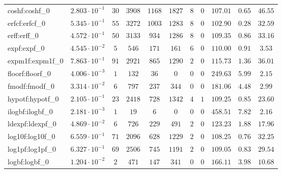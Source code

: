 \begin{tabular}{|l|c|c|c|c|c|c|c|c|c|c|}
coshf:coshf\_0               & $ 2.803 \cdot 10^{-1} $ & $ 30     $ & $ 3908  $ & $ 1168  $ & $ 1827  $ & $ 8   $ & $ 0 $ & $ 107.01      $ & $ 0.65    $ & $ 46.55   $ \\
erfcf:erfcf\_0               & $ 5.345 \cdot 10^{-1} $ & $ 55     $ & $ 3272  $ & $ 1003  $ & $ 1283  $ & $ 8   $ & $ 0 $ & $ 102.90      $ & $ 0.28    $ & $ 32.59   $ \\
erff:erff\_0                 & $ 4.572 \cdot 10^{-1} $ & $ 50     $ & $ 3133  $ & $ 934   $ & $ 1286  $ & $ 8   $ & $ 0 $ & $ 109.35      $ & $ 0.86    $ & $ 33.16   $ \\
expf:expf\_0                 & $ 4.545 \cdot 10^{-2} $ & $ 5      $ & $ 546   $ & $ 171   $ & $ 161   $ & $ 6   $ & $ 0 $ & $ 110.00      $ & $ 0.91    $ & $ 3.53    $ \\
expm1f:expm1f\_0             & $ 7.863 \cdot 10^{-1} $ & $ 91     $ & $ 2921  $ & $ 865   $ & $ 1290  $ & $ 2   $ & $ 0 $ & $ 115.73      $ & $ 1.36    $ & $ 36.01   $ \\
floorf:floorf\_0             & $ 4.006 \cdot 10^{-3} $ & $ 1      $ & $ 132   $ & $ 36    $ & $ 0     $ & $ 0   $ & $ 0 $ & $ 249.63      $ & $ 5.99    $ & $ 2.15    $ \\
fmodf:fmodf\_0               & $ 3.314 \cdot 10^{-2} $ & $ 6      $ & $ 797   $ & $ 237   $ & $ 344   $ & $ 0   $ & $ 0 $ & $ 181.06      $ & $ 4.48    $ & $ 2.99    $ \\
hypotf:hypotf\_0             & $ 2.105 \cdot 10^{-1} $ & $ 23     $ & $ 2418  $ & $ 728   $ & $ 1342  $ & $ 4   $ & $ 1 $ & $ 109.25      $ & $ 0.85    $ & $ 23.60   $ \\
ilogbf:ilogbf\_0             & $ 2.181 \cdot 10^{-3} $ & $ 1      $ & $ 19    $ & $ 6     $ & $ 0     $ & $ 0   $ & $ 0 $ & $ 458.51      $ & $ 7.82    $ & $ 2.16    $ \\
ldexpf:ldexpf\_0             & $ 4.869 \cdot 10^{-2} $ & $ 6      $ & $ 726   $ & $ 229   $ & $ 491   $ & $ 2   $ & $ 0 $ & $ 123.23      $ & $ 1.88    $ & $ 17.96   $ \\
log10f:log10f\_0             & $ 6.559 \cdot 10^{-1} $ & $ 71     $ & $ 2096  $ & $ 628   $ & $ 1229  $ & $ 2   $ & $ 0 $ & $ 108.25      $ & $ 0.76    $ & $ 32.25   $ \\
log1pf:log1pf\_0             & $ 6.327 \cdot 10^{-1} $ & $ 69     $ & $ 2506  $ & $ 745   $ & $ 1191  $ & $ 2   $ & $ 0 $ & $ 109.05      $ & $ 0.83    $ & $ 29.54   $ \\
logbf:logbf\_0               & $ 1.204 \cdot 10^{-2} $ & $ 2      $ & $ 471   $ & $ 147   $ & $ 341   $ & $ 0   $ & $ 0 $ & $ 166.11      $ & $ 3.98    $ & $ 10.68   $ \\

\end{tabular}
